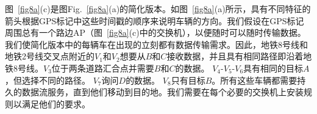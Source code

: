 \documentclass{ctexart}
\begin{document}

图~\ref{fig8a}(c)是图Fig.~\ref{fig8a}(a)的简化版本。如图~\ref{fig8a}(a)所示，具有不同特征的箭头根据GPS标记中这些时间戳的顺序来说明车辆的方向。我们假设在GPS标记周围总有一个路边AP（图~\ref{fig8a}(c)中的交换机），以便随时可以随时传输数据。我们使简化版本中的每辆车在出现的立刻都有数据传输需求。因此，地铁8号线和地铁2号线交叉点附近的$V_ {1}$和$V_ {2}$想要从$B$和$C$接收数据，并且具有相同路径即沿着地铁8号线。$V_ {3}$位于两条道路汇合点并需要$B$和$C$的数据。 $V_{4}$-$V_{5}$-$V_{6}$具有相同的目标$A$，但选择不同的路径。 $V_ {7}$询问$D$的数据。 $V_ {8}$只有目标$B$。所有这些车辆都需要持久的数据流服务，直到他们移动到目的地。我们需要在每个必要的交换机上安装规则以满足他们的要求。



\end{document}
